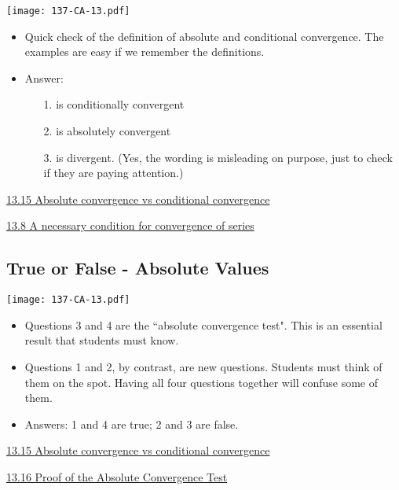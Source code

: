 \documentclass[11pt]{article}
\newcommand{\nl}{\hfill \vspace{-1.1\baselineskip}} %
\newcommand{\vviii}{\hspace{8mm} \href{https://www.youtube.com/watch?v=kP9qHkTSNpI&list=PLlwePzQY_wW-FJMnD_ybkXU_jZLVtZttI&index=8}{13.8 A necessary condition for convergence of series} }
\newcommand{\vxv}{\hspace{8mm} \href{https://www.youtube.com/watch?v=2i0iUwLwwxs&list=PLlwePzQY_wW-FJMnD_ybkXU_jZLVtZttI&index=15}{13.15 Absolute convergence vs conditional convergence} }
\newcommand{\vxvi}{\hspace{8mm} \href{https://www.youtube.com/watch?v=_CSvVbH-0c0&list=PLlwePzQY_wW-FJMnD_ybkXU_jZLVtZttI&index=16}{13.16 Proof of the Absolute Convergence Test} }
\begin{document}
\begin{center}
{ \texttt{[image: 137-CA-13.pdf]}} 
\end{center}

\begin{comments}
\nl
	\begin{itemize}
		\item   Quick check of the definition of absolute and conditional convergence.   The examples are easy if we remember the definitions.
		\item   Answer:
			\begin{itemize}
				\item[1.] is conditionally convergent
				\item[2.] is absolutely convergent
				\item[3.] is divergent.   (Yes, the wording is misleading on purpose, just to check if they are paying attention.)
			\end{itemize}
	\end{itemize}
\end{comments}

\begin{videos}
\vxv

\vviii
\end{videos}

\newpage
\subsection{True or False - Absolute Values}

\begin{center}
{ \texttt{[image: 137-CA-13.pdf]}} 
\end{center}

\begin{comments}
\nl
	\begin{itemize}
		\item   Questions 3 and 4 are the ``absolute convergence test".  This is an essential result that students must know.
		\item Questions 1 and 2, by contrast, are new questions.  Students must think of them on the spot.  Having all four questions together will confuse some of them.
		\item Answers: 1 and 4 are true; 2 and 3 are false.
	\end{itemize}
\end{comments}

\begin{videos}
\vxv

\vxvi
\end{videos}
\end{document}
